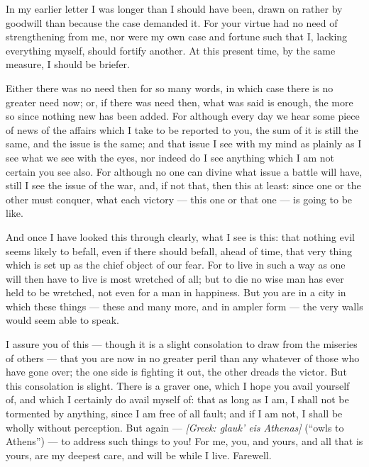 

 In my earlier letter I was longer than I should have been, drawn on rather by goodwill than because the case demanded it. For your virtue had no need of strengthening from me, nor were my own case and fortune such that I, lacking everything myself, should fortify another. At this present time, by the same measure, I should be briefer.

 Either there was no need then for so many words, in which case there is no greater need now; or, if there was need then, what was said is enough, the more so since nothing new has been added. For although every day we hear some piece of news of the affairs which I take to be reported to you, the sum of it is still the same, and the issue is the same; and that issue I see with my mind as plainly as I see what we see with the eyes, nor indeed do I see anything which I am not certain you see also. For although no one can divine what issue a battle will have, still I see the issue of the war, and, if not that, then this at least: since one or the other must conquer, what each victory --- this one or that one --- is going to be like.

 And once I have looked this through clearly, what I see is this: that nothing evil seems likely to befall, even if there should befall, ahead of time, that very thing which is set up as the chief object of our fear. For to live in such a way as one will then have to live is most wretched of all; but to die no wise man has ever held to be wretched, not even for a man in happiness. But you are in a city in which these things --- these and many more, and in ampler form --- the very walls would seem able to speak.

 I assure you of this --- though it is a slight consolation to draw from the miseries of others --- that you are now in no greater peril than any whatever \dag of those who have gone over; the one side is fighting it out, the other dreads the victor. But this consolation is slight. There is a graver one, which I hope you avail yourself of, and which I certainly do avail myself of: that as long as I am, I shall not be tormented by anything, since I am free of all fault; and if I am not, I shall be wholly without perception. But again --- \textit{[Greek: glauk' eis Athenas]} (``owls to Athens'') --- to address such things to you! For me, you, and yours, and all that is yours, are my deepest care, and will be while I live. Farewell.
